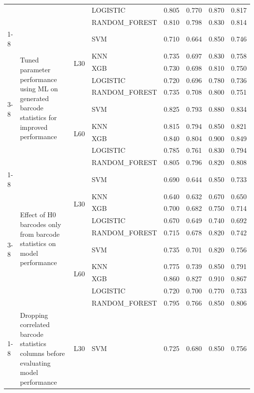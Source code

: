 \begin{table}
\begin{tabular}{llllrrrr}
 &  &  & LOGISTIC & 0.805 & 0.770 & 0.870 & 0.817 \\
 &  &  & RANDOM\_FOREST & 0.810 & 0.798 & 0.830 & 0.814 \\
\cline{1-8} \cline{2-8} \cline{3-8}
\multirow[t]{10}{*}{Experiment 4} & \multirow[t]{10}{*}{Tuned parameter performance using ML on generated barcode statistics for improved performance} & \multirow[t]{5}{*}{L30} & SVM & 0.710 & 0.664 & 0.850 & 0.746 \\
 &  &  & KNN & 0.735 & 0.697 & 0.830 & 0.758 \\
 &  &  & XGB & 0.730 & 0.698 & 0.810 & 0.750 \\
 &  &  & LOGISTIC & 0.720 & 0.696 & 0.780 & 0.736 \\
 &  &  & RANDOM\_FOREST & 0.735 & 0.708 & 0.800 & 0.751 \\
\cline{3-8}
 &  & \multirow[t]{5}{*}{L60} & SVM & 0.825 & 0.793 & 0.880 & 0.834 \\
 &  &  & KNN & 0.815 & 0.794 & 0.850 & 0.821 \\
 &  &  & XGB & 0.840 & 0.804 & 0.900 & 0.849 \\
 &  &  & LOGISTIC & 0.785 & 0.761 & 0.830 & 0.794 \\
 &  &  & RANDOM\_FOREST & 0.805 & 0.796 & 0.820 & 0.808 \\
\cline{1-8} \cline{2-8} \cline{3-8}
\multirow[t]{10}{*}{Experiment 5} & \multirow[t]{10}{*}{Effect of H0 barcodes only from barcode statistics on model performance} & \multirow[t]{5}{*}{L30} & SVM & 0.690 & 0.644 & 0.850 & 0.733 \\
 &  &  & KNN & 0.640 & 0.632 & 0.670 & 0.650 \\
 &  &  & XGB & 0.700 & 0.682 & 0.750 & 0.714 \\
 &  &  & LOGISTIC & 0.670 & 0.649 & 0.740 & 0.692 \\
 &  &  & RANDOM\_FOREST & 0.715 & 0.678 & 0.820 & 0.742 \\
\cline{3-8}
 &  & \multirow[t]{5}{*}{L60} & SVM & 0.735 & 0.701 & 0.820 & 0.756 \\
 &  &  & KNN & 0.775 & 0.739 & 0.850 & 0.791 \\
 &  &  & XGB & 0.860 & 0.827 & 0.910 & 0.867 \\
 &  &  & LOGISTIC & 0.720 & 0.700 & 0.770 & 0.733 \\
 &  &  & RANDOM\_FOREST & 0.795 & 0.766 & 0.850 & 0.806 \\
\cline{1-8} \cline{2-8} \cline{3-8}
\multirow[t]{10}{*}{Experiment 6} & \multirow[t]{10}{*}{Dropping correlated barcode statistics columns before evaluating model performance} & \multirow[t]{5}{*}{L30} & SVM & 0.725 & 0.680 & 0.850 & 0.756 \\

\end{tabular}
\end{table}
